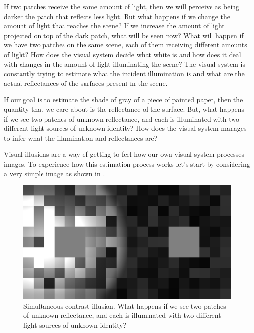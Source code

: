 If two patches receive the same amount of light, then we will perceive as being darker the patch that reflects less light. But what happens if we change the amount of light that reaches the scene? If we increase the amount of light projected on top of the dark patch, what will be seen now? What will happen if we have two patches on the same scene, each of them receiving different amounts of light? How does the visual system decide what white is and how does it deal with changes in the amount of light illuminating the scene? The visual system is constantly trying to estimate what the incident illumination is and what are the actual reflectances of the surfaces present in the scene.


If our goal is to estimate the shade of gray of a piece of painted paper, then the quantity that we care about is the reflectance of the surface. But, what happens if we see two patches of unknown reflectance, and each is illuminated with two different light sources of unknown identity?  How does the visual system manages to infer what the illumination and reflectances are?

%
%



Visual illusions are a way of getting to feel how our own visual system processes images. To experience how this estimation process works let's start by considering a very simple image as shown in \fig{\ref{fig:simultaneous}}.

\begin{figure}[t]
	\centerline{
		\includegraphics[width=1\linewidth]{figures/statistical_image_models/retinex.jpg}
	}
	\caption{Simultaneous contrast illusion. What happens if we see two patches of unknown reflectance, and each is illuminated with two different light sources of unknown identity?}
	\label{fig:simultaneous}
\end{figure}


